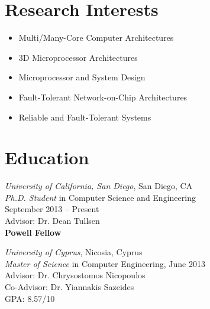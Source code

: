 \documentclass[11pt]{myres} %
\begin{document}
 
\onehalfspacing


\address{
		  \emph{One Miramar Street 929456} \\ 
		  \emph{La Jolla, 92092}   \\ 
		  \emph{San Diego, California}}
		  
\address{
		  \href{mailto:prodromou.andreas@gmail.com} 								   {\underline{prodromou.andreas@gmail.com}} \\ 
		  \href{http://www.andreas-prodromou.com}
		       {\underline{www.andreas-prodromou.com}} \\ 
		  \emph{tel: (858) 263-5813}}
             
                             
\begin{resume}
                                
\singlespacing

\section{Research Interests}
	\begin{itemize}
		\item Multi/Many-Core Computer Architectures
		\item 3D Microprocessor Architectures
		\item Microprocessor and System Design
		\item Fault-Tolerant Network-on-Chip Architectures
		\item Reliable and Fault-Tolerant Systems
	\end{itemize}
 
\section{Education} 
\noindent 
	\emph{University of California, San Diego}, San Diego, CA \\
	\emph{Ph.D. Student} in Computer Science and Engineering \\
	September 2013 -- Present \\
	Advisor: Dr. Dean Tullsen \\
	\textbf{Powell Fellow}

	\emph{University of Cyprus}, Nicosia, Cyprus \\
	\emph{Master of Science} in Computer Engineering, June 2013 \\
	Advisor: Dr. Chrysostomos Nicopoulos \\
	Co-Advisor: Dr. Yiannakis Sazeides \\
	GPA: 8.57/10
	

\end{resume}
\end{document}
